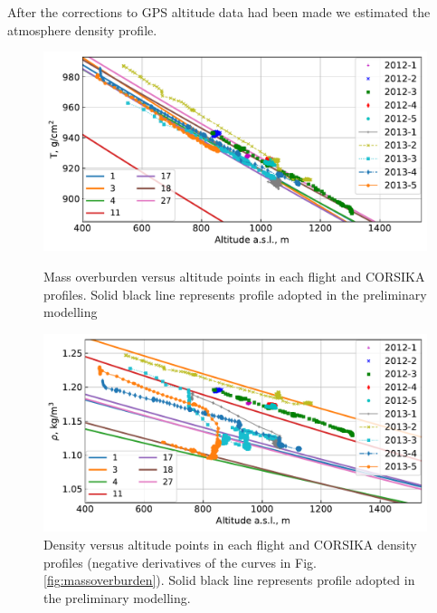 \documentclass[final,5p,times,twocolumn]{elsarticle}
\begin{document}
After the corrections to GPS altitude data had been made we estimated the atmosphere density profile.

\begin{figure}[bt]
\centering
\begin{minipage}[t]{0.48\textwidth}
    \includegraphics[width=\textwidth]{figs/atmosphere_T.pdf}
    \vspace{-1.0pc}
    \caption{Mass overburden versus altitude points in each flight and CORSIKA profiles. Solid black line represents profile adopted in the preliminary modelling}
\label{fig:massoverburden}
\end{minipage}
\vfill
\vspace{1pc}
\begin{minipage}[t]{0.48\textwidth}
    \includegraphics[width=\textwidth]{figs/atmosphere_rho.pdf}
    \vspace{-1.0pc}
    \caption{Density versus altitude points in each flight and CORSIKA density profiles (negative derivatives of the curves in Fig. \ref{fig:massoverburden}). Solid black line represents profile adopted in the preliminary modelling.}
\label{fig:density}
\end{minipage}
\end{figure}
\end{document}
